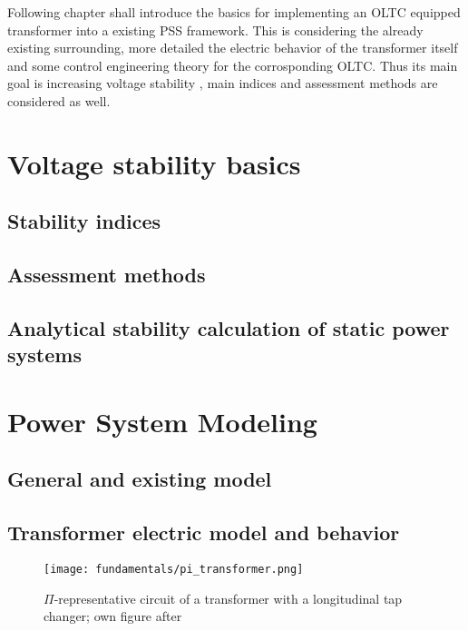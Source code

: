 Following chapter shall introduce the basics for implementing an \acs{OLTC} equipped transformer into a existing \acs{PSS} framework. This is considering the already existing surrounding, more detailed the electric behavior of the transformer itself and some control engineering theory for the corrosponding \acs{OLTC}. Thus its main goal is increasing voltage stability \autocite{machowskiPowerSystemDynamics2020}, main indices and assessment methods are considered as well.

\section{Voltage stability basics}

\subsection{Stability indices}

\subsection{Assessment methods}

\subsection{Analytical stability calculation of static power systems}

\section{Power System Modeling}

\subsection{General and existing model}

\subsection{Transformer electric model and behavior}

\begin{figure}[h!]
    \centering
    \texttt{[image: fundamentals/pi\_transformer.png]}
    \caption[$\Pi$-representative circuit of a transformer with a longitudinal tap changer]{$\Pi$-representative circuit of a transformer with a longitudinal tap changer; own figure after \autocite{machowskiPowerSystemDynamics2020,burlakinEnhancedVoltageControl2024}}
    \label{fig:pi-transformer}
\end{figure}

